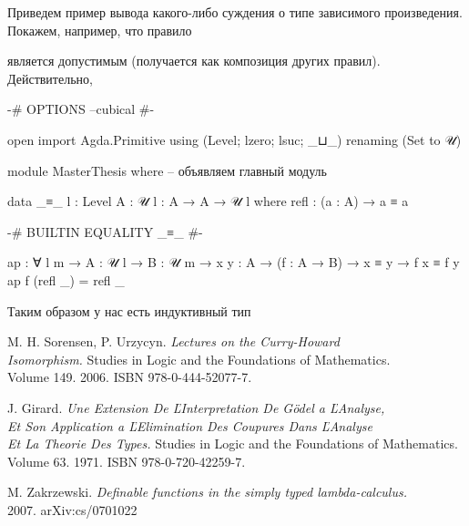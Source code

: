 \documentclass{article}[12pt]
\begin{document}
Приведем пример вывода какого-либо суждения о типе зависимого произведения. Покажем, например, что
правило
\begin{prooftree}
\end{prooftree} 
является допустимым (получается как композиция других правил). Действительно,
\begin{prooftree}
\end{prooftree}

\begin{code}

{-# OPTIONS --cubical #-}

open import Agda.Primitive using (Level; lzero; lsuc; _⊔_)
                           renaming (Set to 𝒰)

module MasterThesis where -- объявляем главный модуль

data _≡_ {l : Level} {A : 𝒰 l} : A → A → 𝒰 l where
    refl : (a : A) → a ≡ a

{-# BUILTIN EQUALITY _≡_  #-}

ap : ∀ {l m} → {A : 𝒰 l} → {B : 𝒰 m} → {x y : A} 
     → (f : A → B) → x ≡ y → f x ≡ f y
ap f (refl _) = refl _

\end{code}

Таким образом у нас есть индуктивный тип 

\begin{thebibliography}{}
    M. H. Sorensen, P. Urzycyn. \textit{Lectures on the Curry-Howard \\ Isomorphism.}
    Studies in Logic and the Foundations of Mathematics. \\ Volume 149. 2006. ISBN
    978-0-444-52077-7.

    J. Girard. \textit{Une Extension De ĽInterpretation De Gödel a ĽAnalyse, \\ Et Son Application  a ĽElimination Des Coupures Dans ĽAnalyse  \\ Et La Theorie Des Types.}
    Studies in Logic and the Foundations of Mathematics. Volume 63. 1971. ISBN 978-0-720-42259-7.

    M. Zakrzewski. \textit{Definable functions in the simply typed lambda-calculus.} \\ 2007.
    arXiv:cs/0701022
\end{thebibliography}
\end{document}
